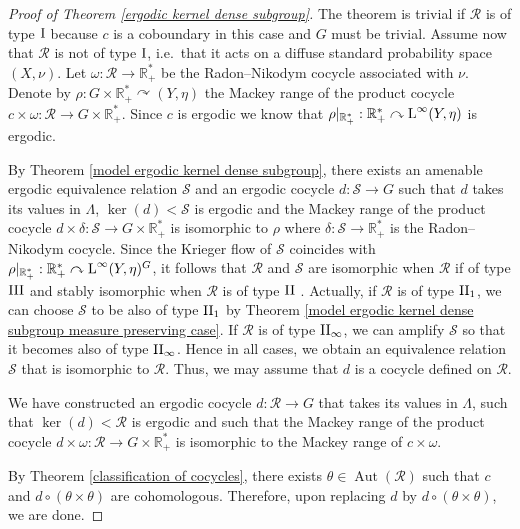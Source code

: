 \documentclass[a4paper,11pt]{amsart}
\numberwithin{equation}{section}
\theoremstyle{definition}
\newcommand{\R}{\mathbb{R}}
\newcommand{\cS}{\mathcal{S}}
\newcommand{\Aut}{\operatorname{Aut}}
\newcommand{\rL}{\mathord{\text{\rm L}}}
\newcommand{\cR}{\mathcal{R}}
\newcommand{\II}{{\rm II}}
\newcommand{\III}{{\rm III}}
\begin{document}
\begin{proof}[Proof of Theorem \ref{ergodic kernel dense subgroup}] The theorem is trivial if $\cR$ is of type $\rm I$ because $c$ is a coboundary in this case and $G$ must be trivial. Assume now that $\cR$ is not of type $\rm I$, i.e.\ that it acts on a diffuse standard probability space $(X, \nu)$. Let $\omega : \mathcal R \to \R^*_+$ be the Radon--Nikodym cocycle associated with $\nu$. Denote by $\rho : G \times \R^*_+ \curvearrowright (Y, \eta)$ the Mackey range of the product cocycle $c \times \omega : \mathcal R \to G \times \R^*_+$. Since $c$ is ergodic we know that $\rho|_{\R^*_+} : \R^*_+ \curvearrowright \rL^\infty(Y, \eta)$ is ergodic.

By Theorem \ref{model ergodic kernel dense subgroup}, there exists an amenable ergodic equivalence relation $\mathcal S$ and an ergodic cocycle $d : \mathcal S \to G$ such that $d$ takes its values in $\Lambda$, $\ker(d) < \mathcal S$ is ergodic and the Mackey range of the product cocycle $d \times \delta : \mathcal S \to G \times \R^*_+$ is isomorphic to $\rho$ where $\delta : \cS \rightarrow \R^*_+$ is the Radon--Nikodym cocycle. Since the Krieger flow of $\mathcal S$ coincides with $\rho|_{\R^*_+} : \R^*_+ \curvearrowright \rL^\infty(Y, \eta)^G$, it follows that $\mathcal R$ and $\mathcal S$ are isomorphic when $\mathcal R$ if of type $\III$ and stably isomorphic when $\mathcal R$ is of type ${\rm II}$ \cite{CFW81, Kr75}. Actually, if $\cR$ is of type $\II_1$, we can choose $\mathcal S$ to be also of type $\II_1$ by Theorem \ref{model ergodic kernel dense subgroup measure preserving case}. If $\cR$ is of type $\II_\infty$, we can amplify $\mathcal S$ so that it becomes also of type $\II_\infty$. Hence in all cases, we obtain  an equivalence relation $\cS$ that is isomorphic to $\cR$. Thus, we may assume that $d$ is a cocycle defined on $\cR$.

We have constructed an ergodic cocycle $d : \mathcal R \to G$ that takes its values in $\Lambda$, such that $\ker(d) < \mathcal R$ is ergodic and such that the Mackey range of the product cocycle $d \times \omega : \mathcal R \to G \times \R^*_+$ is isomorphic to the Mackey range of $c \times \omega$.

By Theorem \ref{classification of cocycles}, there exists $\theta \in \Aut(\mathcal R)$ such that $c$ and $d \circ (\theta \times \theta)$ are cohomologous. Therefore, upon replacing $d$ by $d \circ (\theta \times \theta)$, we are done.
\end{proof}
\end{document}
